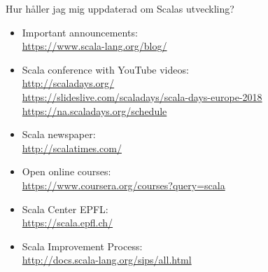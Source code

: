 \begin{Slide}{Hur håller jag mig uppdaterad om Scalas utveckling?}
\begin{itemize}\SlideFontTiny
  \item Important announcements: \\\url{https://www.scala-lang.org/blog/}
  \item Scala conference with YouTube videos: \\
  \url{http://scaladays.org/}\\
  \url{https://slideslive.com/scaladays/scala-days-europe-2018}\\
  \url{https://na.scaladays.org/schedule}\\

  \item Scala newspaper: \\\url{http://scalatimes.com/}
  \item Open online courses: \\\url{https://www.coursera.org/courses?query=scala}
  \item Scala Center \@ EPFL: \\ \url{https://scala.epfl.ch/}
  \item Scala Improvement Process: \\
  \url{http://docs.scala-lang.org/sips/all.html}
\end{itemize}
\end{Slide}




%
%



